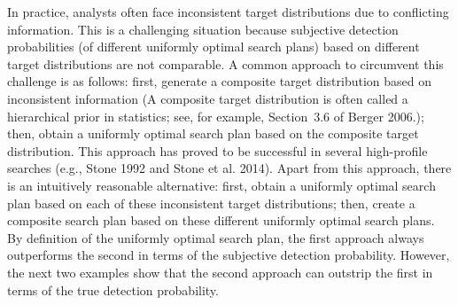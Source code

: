 \documentclass[12pt]{article}
\theoremstyle{plain}
\theoremstyle{definition}
\theoremstyle{remark}
\begin{document}
In practice, analysts often face inconsistent target distributions due to conflicting information.  This is a challenging situation because subjective detection probabilities (of different uniformly optimal search plans) based on different target distributions are not comparable.  A common approach to circumvent this challenge is as follows: first,  generate a composite target distribution based on inconsistent information (A composite target distribution is often called a hierarchical prior in statistics; see, for example,   Section~3.6  of Berger 2006.); then, obtain a uniformly optimal search plan based on the composite target distribution.  This approach has proved to be successful in several high-profile searches (e.g., Stone 1992 and Stone et al.  2014).  Apart from this approach, there is an intuitively reasonable alternative: first,  obtain a uniformly optimal search plan based on each of these inconsistent target distributions; then, create a composite search plan based on these different uniformly optimal search plans.  By definition of the uniformly optimal search plan, the first approach always outperforms the second in terms of the subjective detection probability.  However,  the next two examples show that the second approach can outstrip the first in terms of the true detection probability.
\end{document}
